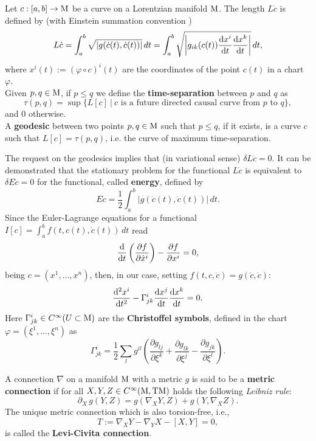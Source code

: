 \begin{definition}
	Let $c : [a,b]\to \mathrm{M}$ be a curve on a Lorentzian manifold $\mathrm{M}$. The
	length $L\dot{c}$ is defined by (with Einstein summation convention )
	\[ L\dot{c}=\int_{a}^{b} \sqrt{|g(\dot{c}(t),\dot{c}(t))|}\,d t=\int_{a}^{b} \sqrt{\left|g_{ik}(c(t)) \displaystyle \frac{\mathrm d x^i}{\mathrm d t}\displaystyle \frac{\mathrm d x^k}{\mathrm d t}\right|}\,d t,\]
	where $x^i(t):=(\varphi\circ c)^i(t)$ are the coordinates of the point $c(t)$ in a chart $\varphi$.\\
	Given $p,q\in\mathrm{M}$, if $p\leq q$ we define the \textbf{time-separation} between $p$ and $q$ as
	\[\tau(p,q)=\sup\{L[c]\ |\ c \text{ is a future directed causal curve from }p\text{ to } q\}, \]
	and $0$ otherwise.\\
	A \textbf{geodesic} between two points $p,q\in\mathrm{M}$ such that $p\leq q$, if it exists, is a curve $c$ such that $L[c]=\tau(p,q)$, i.e. the curve of maximum time-separation.
\end{definition}
\noindent The request on the geodesics implies that (in variational sense) $\delta L\dot{c}=0$. It can be demonstrated that the stationary problem for the functional $L\dot{c}$ is equivalent to $\delta E\dot{c}=0$ for the functional, called \textbf{energy}, defined by
\[		E\dot{c}=\frac{1}{2}\int_{a}^{b} {|g(\dot{c}(t),\dot{c}(t))|}\,d t.	\]
Since the Euler-Lagrange equations for a functional $I[c]=\int_{a}^{b} f(t,c(t),\dot{c}(t))\, dt$ read
\[		\displaystyle \frac{\mathrm d  }{\mathrm d t}\left(\frac{\partial f}{\partial \dot{x}^i}\right)-\frac{\partial f}{\partial x^i}=0,	\]
being $c=(x^1,\dots,x^n)$, then, in our case, setting $f(t,c,\dot{c})=g(\dot{c},\dot{c})$:
\[  \frac{\mathrm d^2 x^i}{\mathrm d t^2}-\Gamma_{jk}^i\displaystyle \frac{\mathrm d x^j}{\mathrm d t}\displaystyle \frac{\mathrm d x^k}{\mathrm d t}=0.	\]
Here $\Gamma_{jk}^i\in C^\infty (U\subset\mathrm{M})$ are the \textbf{Christoffel symbols}, defined in the chart $\varphi=(\xi^1,\dots,\xi^n)$ as
\[	\Gamma_{jk}^i=\frac12 \sum_l g^{il} \left(
\frac{\partial g_{lj}}{\partial \xi^k} 
+\frac{\partial g_{lk}}{\partial \xi^j}
-\frac{\partial g_{jk}}{\partial \xi^l}
\right).	\]

\begin{definition}
	A connection $\nabla$ on a manifold $\mathrm{M}$ with a metric $g$ is said to be a \textbf{metric connection} if for all $X,Y,Z\in C^\infty (\mathrm{M},\mathrm{T}\mathrm{M})$ holds the following \emph{Leibniz rule}:
	\[		\partial_X\,g(Y,Z)=g(\nabla_X Y, Z)+g(Y,\nabla_X Z).	\]
	The unique metric connection which is also torsion-free, i.e.,
	\[		T:=\nabla_X Y-\nabla_Y X-[X,Y]=0,	\]
	is called the \textbf{Levi-Civita connection}. 
\end{definition}

